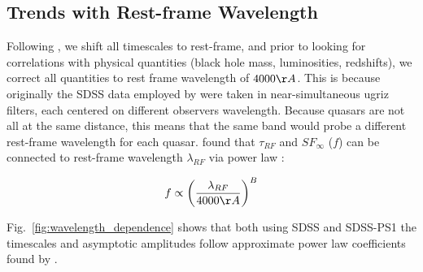 \documentclass[twocolumn]{aastex62}
\begin{document}
\begin{figure*}
\caption{Comparing the rest-frame timescales $\tau$, and asymptotic variability amplitudes $SF_{\infty}$, for \citet{macleod2011} SDSS r-band,  and combined SDSS and PS1 data.  }
\label{fig:tauRF_SFinf}
\end{figure*} 



\begin{figure*}
\caption{Plot comparing results for SDSS r-band fitting of \citet{macleod2011} ($\sigma_{m}, \tau_{m}$), and current results for SDSS r-band using Celerite ($\sigma_{fit}, \tau_{fit}$). }
\label{fig:celeriteCompare}
\end{figure*} 





\subsection{Trends with Rest-frame Wavelength}

Following  \citet{macleod2011} , we shift all timescales to rest-frame, and prior to looking for correlations with physical quantities (black hole mass, luminosities, redshifts), we correct all quantities to rest frame wavelength of $4000 \AA $. This is because originally the SDSS data employed by  \citet{macleod2011}  were taken in near-simultaneous ugriz filters, each centered on different observers wavelength. Because quasars are not all at the same distance, this means that the same band would probe a different rest-frame wavelength for each quasar.   \citet{macleod2011}  found that $\tau_{RF}$ and $SF_{\infty}$  ($f$) can be connected to rest-frame wavelength $\lambda_{RF}$ via power law  :  

\begin{equation}
f \propto \left( \frac{\lambda_{RF}}{4000 \AA} \right)^{B}
\end{equation}

Fig.~\ref{fig:wavelength_dependence}  shows that both using SDSS and SDSS-PS1 the timescales and asymptotic amplitudes follow approximate power law coefficients found by \citet{macleod2011}. 
\
\begin{figure*}
\caption{Rest-frame timescale $\tau$ (top panel), and long-term structure function $SF_{\infty}$ (bottom panel), as a function of rest-frame wavelength $\lambda_{RF}$. The background contours show \citet{macleod2011} SDSS ugriz data, and the foreground contours  denote the SDSS (red) and SDSS-PS1 (orange) new results with Celerite. In all datasets the quasars were selected according to criteria of \citet{macleod2011}. The red line indicates the best-fit power law to \citet{macleod2011} data, with $B=0.17$ an $-0.479$ for $\tau_{RF}$, and $SF_{\infty}$, respectively.}
\label{fig:wavelength_dependence}
\end{figure*} 
\end{document}
